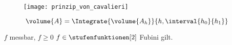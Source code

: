 \begin{bemerkung}\label{prinzip_von_cavalieri}
  \begin{figure}[H]
    \centering
    \texttt{[image: prinzip\_von\_cavalieri]}
    \label{fig:prinzip_von_cavalieri}
  \end{figure}
  \begin{equation*}
    \volume{A}=\Integrate{\volume{A_h}}{h,\interval{h_0}{h_1}}
  \end{equation*}
\end{bemerkung}
\begin{bemerkung}
  \( f \) messbar, \( f\geq 0 \) \timplies \( f\in \stufenfunktionen[2] \) \timplies Fubini gilt.
\end{bemerkung}
